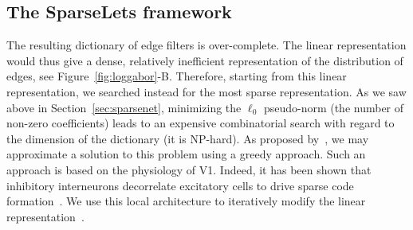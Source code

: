 \documentclass[a4paper, 11pt]{book}
\begin{document}
\subsection{The SparseLets framework}
\label{sec:matchingpursuit}
The resulting dictionary of edge filters is over-complete.
The linear representation would thus give a dense, relatively inefficient representation of the distribution of edges, see Figure~\ref{fig:loggabor}-B.
Therefore, starting from this linear representation,
we searched instead for the most sparse representation.
As we saw above in Section~\ref{sec:sparsenet}, minimizing the $\ell_0$ pseudo-norm (the number of non-zero coefficients) leads
to an expensive combinatorial search with regard to the dimension of the dictionary (it is NP-hard).
As proposed by~\citet{Perrinet03ieee}, we may approximate a
solution to this problem using a greedy approach.
Such an approach is based on the physiology of V1.
Indeed, it has been shown that inhibitory interneurons decorrelate excitatory cells to drive sparse code formation~\citep{Bolz89,King13}.
We use this local architecture to iteratively modify the linear representation~\citep{Fischer07}.
\end{document}
